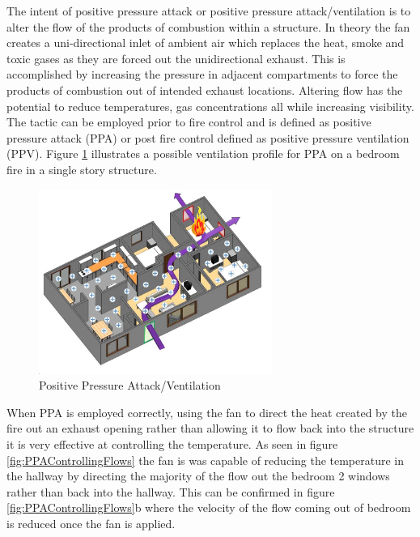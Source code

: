\documentclass{article}
\begin{document}
The intent of positive pressure attack or positive pressure attack/ventilation is to alter the flow of the products of combustion within a structure. In theory the fan creates a uni-directional inlet of ambient air which replaces the heat, smoke and toxic gases as they are forced out the unidirectional exhaust. This is accomplished by increasing the pressure in adjacent compartments to force the products of combustion out of intended exhaust locations. Altering flow has the potential to reduce temperatures, gas concentrations all while increasing visibility. The tactic can be employed prior to fire control and is defined as positive pressure attack (PPA) or post fire control defined as positive pressure ventilation (PPV).  Figure \ref{fig:PPAConcept} illustrates a possible ventilation profile for PPA on a bedroom fire in a single story structure. 

\begin{figure}[H]
	\centering
	\includegraphics[width = 3in]{0_Images/Tactical_Considerations/Understanding_Basics/Positive_Pressure.jpg}
	\caption{Positive Pressure Attack/Ventilation}
	\label{fig:PPAConcept}
\end{figure}

When PPA is employed correctly, using the fan to direct the heat created by the fire out an exhaust opening rather than allowing it to flow back into the structure it is very effective at controlling the temperature. As seen in figure \ref{fig:PPAControllingFlows} the fan is was capable of reducing the temperature in the hallway by directing the majority of the flow out the bedroom 2 windows rather than back into the hallway. This can be confirmed in figure \ref{fig:PPAControllingFlows}b where the velocity of the flow coming out of bedroom is reduced once the fan is applied. 
\end{document}
